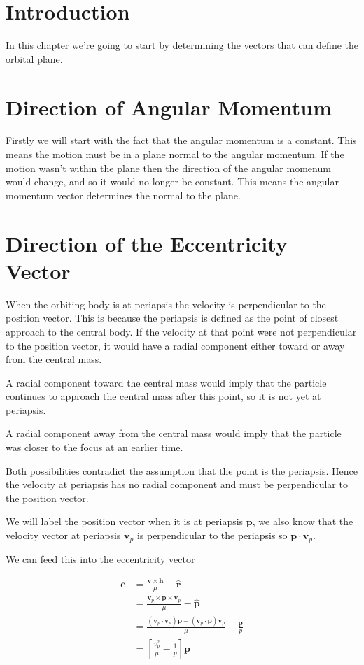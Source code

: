 \section{Introduction}

In this chapter we're going to start by determining the vectors
that can define the orbital plane.

\section{Direction of Angular Momentum}
Firstly we will start with the fact that the angular momentum is a constant.
This means the motion must be in a plane normal to the angular momentum. If the
motion wasn't within the plane then the direction of the angular momenum would
change, and so it would no longer be constant. This means the angular momentum
vector determines the normal to the plane.

\section{Direction of the Eccentricity Vector}

When the orbiting body is at periapsis the velocity is perpendicular to the position vector.
This is because the periapsis is defined as the point of closest approach to the central body.
If the velocity at that point were not perpendicular to the position vector, it would have a 
radial component either toward or away from the central mass.

A radial component toward the central mass would imply that the particle continues to approach the
central mass after this point, so it is not yet at periapsis.

A radial component away from the central mass would imply that the particle was closer to the focus
at an earlier time.

Both possibilities contradict the assumption that the point is the periapsis.
Hence the velocity at periapsis has no radial component and must be perpendicular to the position vector.

We will label the position vector when it is at periapsis $\mathbf{p}$, we also know that the velocity
vector at periapsis $\mathbf{v}_p$ is perpendicular to the periapsis so $\mathbf{p} \cdot \mathbf{v}_p$.

We can feed this into the eccentricity vector

\begin{align}
\mathbf{e}&=\frac{\mathbf{v}\times\mathbf{h}}{\mu}-\hat{\mathbf{r}}\nonumber \\
&=\frac{\mathbf{v}_p\times\mathbf{p}\times\mathbf{v}_p}{\mu}-\hat{\mathbf{p}}\nonumber \\
&=\frac{(\mathbf{v}_p\cdot\mathbf{v}_p)\mathbf{p}-(\mathbf{v}_p\cdot\mathbf{p})\mathbf{v}_p}{\mu}-\frac{\mathbf{p}}{p}\nonumber \\
&=\left[\frac{v_p^2}{\mu}-\frac{1}{p}\right]\mathbf{p}\nonumber \\
\end{align}

